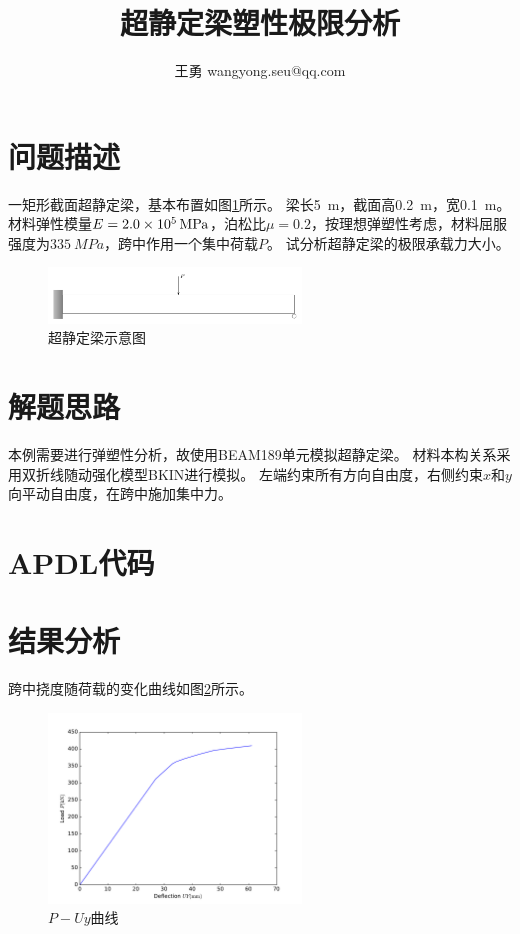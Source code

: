 \documentclass{article}
\title{超静定梁塑性极限分析}
\author{王勇 wangyong.seu@qq.com}
\begin{document}
\maketitle
\section{问题描述}
一矩形截面超静定梁，基本布置如图\ref{fig:beam-diagram}所示。
梁长\SI{5}{m}，截面高\SI{0.2}{m}，宽\SI{0.1}{m}。
材料弹性模量$E=\SI{2.0E5}{MPa}$，泊松比$\mu=0.2$，按理想弹塑性考虑，材料屈服强度为$\SI{335}{MPa}$，跨中作用一个集中荷载$P$。
试分析超静定梁的极限承载力大小。

\begin{figure}[!h]
\centering
\includegraphics[width=0.6\textwidth]{./fig/beam_diagram.pdf}
\caption{超静定梁示意图}\label{fig:beam-diagram}
\end{figure}

\section{解题思路}
本例需要进行弹塑性分析，故使用BEAM189单元模拟超静定梁。
材料本构关系采用双折线随动强化模型BKIN进行模拟。
左端约束所有方向自由度，右侧约束$x$和$y$向平动自由度，在跨中施加集中力。

\section{APDL代码}


\section{结果分析}
跨中挠度随荷载的变化曲线如图\ref{fig:P-Uy}所示。
\begin{figure}[!h]
\centering
\includegraphics[width=0.6\textwidth]{./fig/P-Uy.pdf}
\caption{$P-Uy$曲线}\label{fig:P-Uy}
\end{figure}
\end{document}
